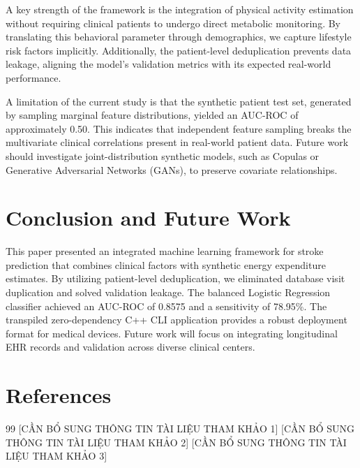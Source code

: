 \documentclass[11pt,letterpaper]{article}
\begin{document}
A key strength of the framework is the integration of physical activity estimation without requiring clinical patients to undergo direct metabolic monitoring. By translating this behavioral parameter through demographics, we capture lifestyle risk factors implicitly. Additionally, the patient-level deduplication prevents data leakage, aligning the model's validation metrics with its expected real-world performance.

A limitation of the current study is that the synthetic patient test set, generated by sampling marginal feature distributions, yielded an AUC-ROC of approximately 0.50. This indicates that independent feature sampling breaks the multivariate clinical correlations present in real-world patient data. Future work should investigate joint-distribution synthetic models, such as Copulas or Generative Adversarial Networks (GANs), to preserve covariate relationships.

\section{Conclusion and Future Work}
This paper presented an integrated machine learning framework for stroke prediction that combines clinical factors with synthetic energy expenditure estimates. By utilizing patient-level deduplication, we eliminated database visit duplication and solved validation leakage. The balanced Logistic Regression classifier achieved an AUC-ROC of 0.8575 and a sensitivity of 78.95\%. The transpiled zero-dependency C++ CLI application provides a robust deployment format for medical devices. Future work will focus on integrating longitudinal EHR records and validation across diverse clinical centers.

\section*{References}
\begin{thebibliography}{99}
 [CẦN BỔ SUNG THÔNG TIN TÀI LIỆU THAM KHẢO 1]
 [CẦN BỔ SUNG THÔNG TIN TÀI LIỆU THAM KHẢO 2]
 [CẦN BỔ SUNG THÔNG TIN TÀI LIỆU THAM KHẢO 3]
\end{thebibliography}
\end{document}

